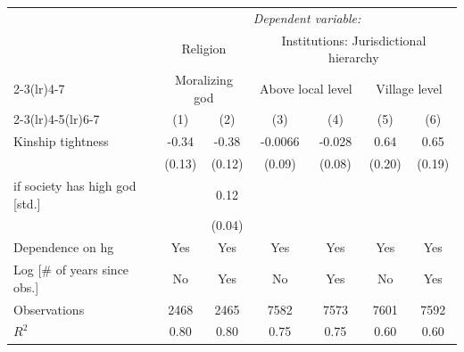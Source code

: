 {\begin{tabular}{l*{6}{c}}\toprule\toprule&\multicolumn{6}{c}{\textit{Dependent variable:}}\\[.1cm] &    \multicolumn{2}{c}{Religion}&\multicolumn{4}{c}{Institutions: Jurisdictional hierarchy}\\\cmidrule(lr){2-3}\cmidrule(lr){4-7}  & \multicolumn{2}{c}{Moralizing god}&\multicolumn{2}{c}{Above local level} & \multicolumn{2}{c}{Village level}\\\cmidrule(lr){2-3}\cmidrule(lr){4-5}\cmidrule(lr){6-7}
                &\multicolumn{1}{c}{(1)}         &\multicolumn{1}{c}{(2)}         &\multicolumn{1}{c}{(3)}         &\multicolumn{1}{c}{(4)}         &\multicolumn{1}{c}{(5)}         &\multicolumn{1}{c}{(6)}         \\
\midrule
Kinship tightness&    -0.34\sym{**} &    -0.38\sym{***}&  -0.0066         &   -0.028         &     0.64\sym{***}&     0.65\sym{***}\\
                &   (0.13)         &   (0.12)         &   (0.09)         &   (0.08)         &   (0.20)         &   (0.19)         \\
\addlinespace
1 if society has high god [std.]&                  &     0.12\sym{***}&                  &                  &                  &                  \\
                &                  &   (0.04)         &                  &                  &                  &                  \\
\addlinespace
Dependence on hg&      Yes         &      Yes         &      Yes         &      Yes         &      Yes         &      Yes         \\
\addlinespace
Log [\# of years since obs.]&       No         &      Yes         &       No         &      Yes         &       No         &      Yes         \\
\midrule
Observations    &     2468         &     2465         &     7582         &     7573         &     7601         &     7592         \\
\(R^{2}\)       &     0.80         &     0.80         &     0.75         &     0.75         &     0.60         &     0.60         \\
\bottomrule
\end{tabular}
}
